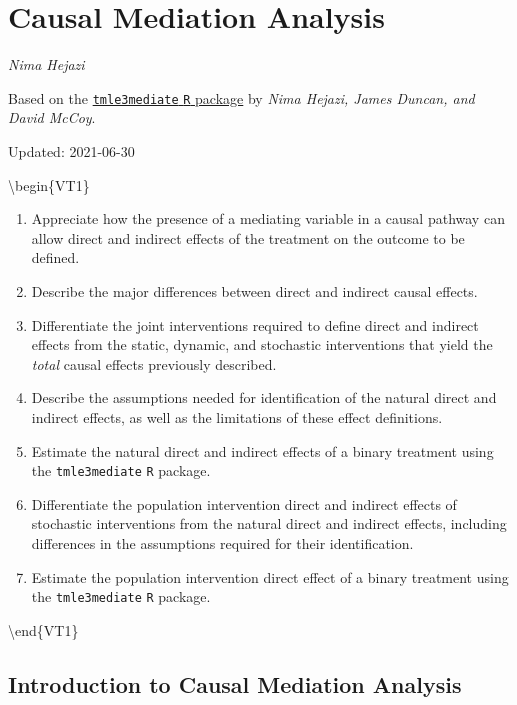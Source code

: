 \documentclass[12pt, krantz2,]{krantz}
\newcommand{\passthrough}[1]{#1}
\providecommand{\tightlist}{%
  \setlength{\itemsep}{0pt}\setlength{\parskip}{0pt}}
\theoremstyle{definition}
\theoremstyle{definition}
\theoremstyle{definition}
\newcommand{\1}{\mathbbm{1}}
\begin{document}
\hypertarget{causal-mediation-analysis}{%
\chapter{Causal Mediation Analysis}\label{causal-mediation-analysis}}

\emph{Nima Hejazi}

Based on the \href{https://github.com/tlverse/tmle3mediate}{\passthrough{\lstinline!tmle3mediate!} \passthrough{\lstinline!R!}
package} by \emph{Nima Hejazi, James
Duncan, and David McCoy}.

Updated: 2021-06-30

\textbackslash{}begin\{VT1\}

\begin{enumerate}
\def\labelenumi{\arabic{enumi}.}
\tightlist
\item
  Appreciate how the presence of a mediating variable in a causal pathway can
  allow direct and indirect effects of the treatment on the outcome to be
  defined.
\item
  Describe the major differences between direct and indirect causal effects.
\item
  Differentiate the joint interventions required to define direct and indirect
  effects from the static, dynamic, and stochastic interventions that yield
  the \emph{total} causal effects previously described.
\item
  Describe the assumptions needed for identification of the natural direct and
  indirect effects, as well as the limitations of these effect definitions.
\item
  Estimate the natural direct and indirect effects of a binary treatment using
  the \passthrough{\lstinline!tmle3mediate!} \passthrough{\lstinline!R!} package.
\item
  Differentiate the population intervention direct and indirect effects of
  stochastic interventions from the natural direct and indirect effects,
  including differences in the assumptions required for their identification.
\item
  Estimate the population intervention direct effect of a binary treatment
  using the \passthrough{\lstinline!tmle3mediate!} \passthrough{\lstinline!R!} package.
\end{enumerate}

\textbackslash{}end\{VT1\}

\hypertarget{introduction-to-causal-mediation-analysis}{%
\section{Introduction to Causal Mediation Analysis}\label{introduction-to-causal-mediation-analysis}}
\end{document}
